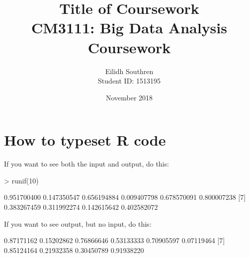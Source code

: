 \documentclass[12pt]{article}         %
\title{\Huge Title of Coursework \\[0.5in] \large CM3111: Big Data Analysis Coursework \\[2in]}  %
\author{Eilidh Southren \\[0.25in] Student ID: 1513195\\[3in]}          %
\date{November 2018}
\begin{document}





\maketitle              %
\pagebreak
\tableofcontents        %
\pagebreak
\section{How to typeset \textsf{R} code}

If you want to see both the input and output, do this:

\begin{Schunk}
\begin{Sinput}
> runif(10)
\end{Sinput}
\begin{Soutput}
 [1] 0.951700400 0.147350547 0.656194884 0.009407798 0.678570091 0.800007238
 [7] 0.383267459 0.311992274 0.142615642 0.402582072
\end{Soutput}
\end{Schunk}

If you want to see output, but no input, do this:

\begin{Schunk}
\begin{Soutput}
 [1] 0.87171162 0.15202862 0.76866646 0.53133333 0.70905597 0.07119464
 [7] 0.85124164 0.21932358 0.30450789 0.91938220
\end{Soutput}
\end{Schunk}
\end{document}
